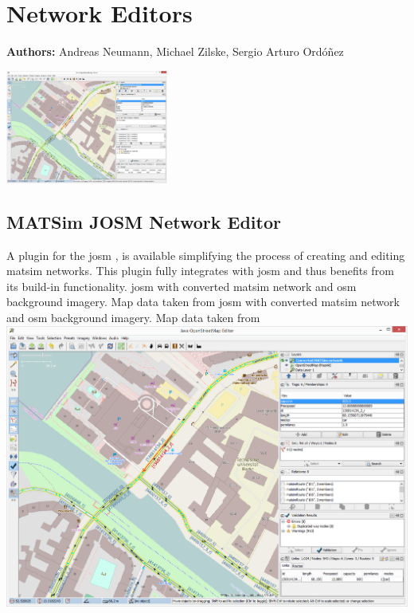 \chapter{Network Editors}
\label{ch:networkeditor}

\hfill \textbf{Authors:} Andreas Neumann, Michael Zilske, Sergio Arturo Ordóñez

\begin{center} \includegraphics[width=0.4\textwidth, angle=0]{extending/figures/networkeditor/josm_screenshot} \end{center}


\section{MATSim JOSM Network Editor}
A plugin for the \gls{josm} \citep[][]{JOSM2014}, is available simplifying the process of creating and editing \gls{matsim} networks. This plugin fully integrates with \gls{josm} and thus benefits from its build-in functionality.
%
\createfigure
{\protect\gls{josm} with converted \protect\gls{matsim} network and \protect\gls{osm} background imagery. Map data taken from \citet[][]{OpenStreetMap2014}}
{\protect\gls{josm} with converted \protect\gls{matsim} network and \protect\gls{osm} background imagery. Map data taken from \citet[][]{OpenStreetMap2014}}
{\label{fig:networkeditor_screenshot}}
{\includegraphics[width=1.0\textwidth]{extending/figures/networkeditor/josm_screenshot}}
{}

